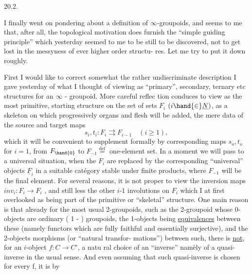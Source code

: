 20.2.

I finally went on pondering about a definition of $\infty$-groupoids, and 
seems to me that, after all, the topological motivation does furnish the
``simple guiding principle'' which yesterday seemed to me to be still to be
discovered,  not to get lost in the messyness of ever higher order structu-%
res. Let me try to put it down roughly.

 First I would like to correct somewhat the rather undiscriminate
description I gave yesterday of what I thought of viewing as ``primary'',
secondary, ternary etc structures for an $\infty$ - groupoid. More careful reflec%
\hand{-}tion conduces to view as the most primitive, starting structure on the
set of sets $F_i$ $(i\hand{\in}\underline{N})$, as a skeleton on which progressively organs and
flesh will be added, the mere data of the source and target maps
\[ s_i, t_i : F_i \rightrightarrows F_{i-1} \quad (i \geqslant 1) , \]
which it will be convenient to supplement  formally by corresponding
maps $s_o, t_o$ for $i=1$, from $F_{\hand{0}}$ to $F_{-1} \overset{\mathrm{def}}{=}$ one-element set. In a moment
we will pass to a universal situation, when the $F_i$ are replaced by
the corresponding ``universal'' objects $\underline{F}_i$ in a suitable cat\'egory stable
under finite products, where $F_{-1}$ will be the final element. For several
reasons, it is not proper to view the inversion maps $inv_i : F_i \to F_i$ ,
and still less the other $i$-$1$ involutions on $F_i$ which I at first overlooked\hand{,}
as being part of the primitive or ``skeletal'' structure. One main reason
is that already for the most usual 2-groupoids, such as the 2-groupoid
whose 0-objects are ordinary ( 1 - ) groupoids, the 1-objects being
\uline{equivalences} between these (namely functors which are fully faithful and
essentially surjective), and the 2-objects morphisms (or ``natural transfor-%
mations'') between such, there is \uline{not}, for an $i$-object $f : C \to C'$, a natu%
\hand{-} ral choice of an ``inverse'' nam\`ely of a quasi-inverse in the usual sense.
And even\hand{,} assuming that such quasi-inverse is chosen for every f, it is by
